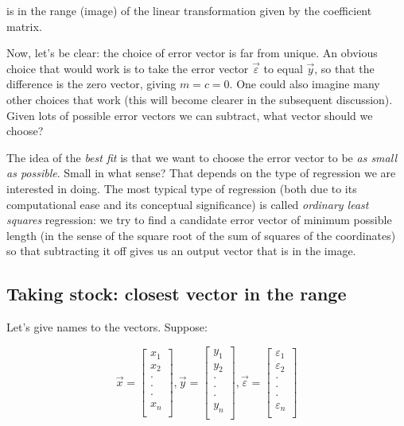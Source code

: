 \documentclass[10pt]{amsart}
\begin{document}
is in the range (image) of the linear transformation given by the
coefficient matrix.

Now, let's be clear: the choice of error vector is far from unique. An
obvious choice that would work is to take the error vector
$\vec{\varepsilon}$ to equal $\vec{y}$, so that the difference is the
zero vector, giving $m = c = 0$. One could also imagine many other
choices that work (this will become clearer in the subsequent
discussion). Given lots of possible error vectors we can subtract,
what vector should we choose?

The idea of the {\em best fit} is that we want to choose the error
vector to be {\em as small as possible}. Small in what sense? That
depends on the type of regression we are interested in doing. The most
typical type of regression (both due to its computational ease and its
conceptual significance) is called {\em ordinary least squares}
regression: we try to find a candidate error vector of minimum
possible length (in the sense of the square root of the sum of squares
of the coordinates) so that subtracting it off gives us an output
vector that is in the image.

\subsection{Taking stock: closest vector in the range}

Let's give names to the vectors. Suppose:

$$\vec{x} = \left[\begin{matrix} x_1 \\ x_2 \\ \cdot \\ \cdot \\ \cdot \\ x_n \\\end{matrix}\right], \vec{y} = \left[\begin{matrix} y_1 \\ y_2 \\ \cdot \\ \cdot \\ \cdot \\ y_n \\\end{matrix}\right], \vec{\varepsilon} = \left[\begin{matrix} \varepsilon_1 \\ \varepsilon_2 \\ \cdot \\ \cdot \\ \cdot \\ \varepsilon_n \\\end{matrix}\right]$$
\end{document}
